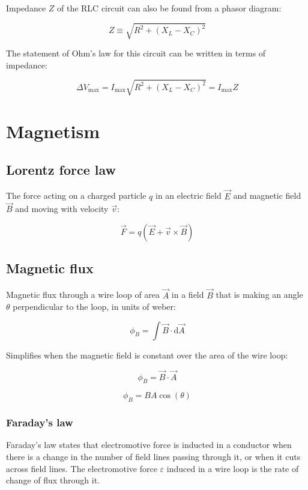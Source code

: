 \documentclass[12pt]{article}
\begin{document}
Impedance $Z$ of the RLC circuit can also be found from a phasor diagram:

\[
\boxed{
Z \equiv \sqrt{R^2 + (X_L - X_C)^2}
}
\]

The statement of Ohm's law for this circuit can be written in terms of impedance:

\[
\boxed{
\Delta V_{\text{max}} = I_{\text{max}}\sqrt{R^2 + (X_L - X_C)^2} = I_{\text{max}}Z
}
\]

\newpage

\section{Magnetism}

\subsection{Lorentz force law}

The force acting on a charged particle $q$ in an electric field $\vec{E}$ and magnetic field $\vec{B}$ and moving with velocity $\vec{v}$:

\[
\boxed{\vec{F} = q\left(\vec{E} + \vec{v} \times \vec{B}\right)}
\]

\subsection{Magnetic flux}

Magnetic flux through a wire loop of area $\vec{A}$ in a field $\vec{B}$ that is making an angle $\theta$ perpendicular to the loop, in units of weber:

\[
\boxed{
\phi_B = \int \vec{B} \cdot \mathrm{d}\vec{A}
}
\]

Simplifies when the magnetic field is constant over the area of the wire loop:

\[
\boxed{
\phi_B = \vec{B} \cdot \vec{A}
}
\]

\[
\boxed{
\phi_B = BA\cos(\theta)
}
\]

\subsubsection{Faraday's law}

Faraday's law states that electromotive force is inducted in a conductor when there is a change in the number of field lines passing through it, or when it cuts across field lines. The electromotive force $\varepsilon$ induced in a wire loop is the rate of change of flux through it.
\end{document}
